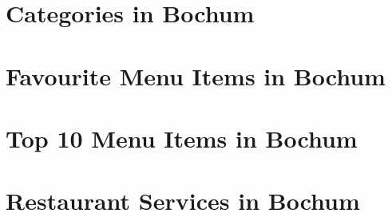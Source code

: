 \begin{appendices}
\renewcommand{\thesection}{\appendixname~\Alph{section}}
\section{Categories in Bochum}
\label{app:category}

\section{Favourite Menu Items in Bochum}
\label{app:fav_items}

\section{Top 10 Menu Items in Bochum}
\label{app:items}

\section{Restaurant Services in Bochum}
\label{app:items}

\end{appendices}
